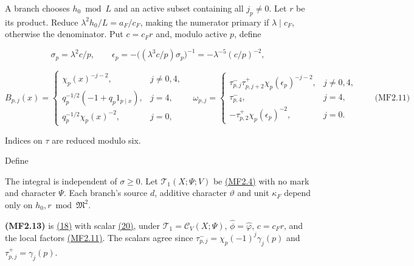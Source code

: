 A branch chooses \(h_0\bmod L\) and an active subset containing all \(j_p\ne0\). Let \(r\) be its product. Reduce \(\lambda^2h_0/L=a_F/c_F\), making the numerator primary if \(\lambda\mid c_F\), otherwise the denominator. Put \(c=c_Fr\) and, modulo active \(p\), define

\[
\sigma_p=\lambda^2c/p,\qquad
\epsilon_p=-\bigl((\lambda^3c/p)\sigma_p\bigr)^{-1}
          =-\lambda^{-5}(c/p)^{-2},
\]

\hypertarget{mf:eq:B2.11}{}

\label{mf:eq:B2.11}

\[
B_{p,j}(x)=
\begin{cases}
\chi_p(x)^{-j-2},&j\ne0,4,\\
q_p^{-1/2}(-1+q_p1_{p\mid x}),&j=4,\\
q_p^{-1/2}\chi_p(x)^{-2},&j=0,
\end{cases}
\quad
\omega_{p,j}=
\begin{cases}
\tau_{p,j}^-\tau_{p,j+2}^+\chi_p(\epsilon_p)^{-j-2},&j\ne0,4,\\
\tau_{p,4}^-,&j=4,\\
-\tau_{p,2}^+\chi_p(\epsilon_p)^{-2},&j=0.
\end{cases}
\qquad\text{(MF2.11)}
\]

Indices on \(\tau\) are reduced modulo six.

Define

\hypertarget{mf:eq:B2.12}{}

\label{mf:eq:B2.12}

\par\noindent\resizebox{\linewidth}{!}{\begin{minipage}{\dimexpr\linewidth+33.76625pt\relax}\[
K_*=\frac{(2\pi)^4}{27},\qquad
\mathcal R(t)=\prod_\pm\frac{\Gamma(1+t\pm1/6)}{\Gamma(1-t\pm1/6)},\qquad
V^\sharp(x)=\frac1{2\pi i}\int_{(\sigma)}
\widehat V(-t)\mathcal R(t)(K_*x)^{-t}\,dt,\quad \sigma\ge0.
\qquad\text{(MF2.12)}
\]\end{minipage}}\par

The integral is independent of \(\sigma\ge0\). Let \(\mathcal T_1(X;\Psi;V)\) be \protect\hyperlink{mf:eq:B2.4}{(MF2.4)} with no mark and character \(\Psi\). Each branch's source \(d\), additive character \(\vartheta\) and unit \(\kappa_F\) depend only on \(h_0,r\bmod\mathfrak M^2\).

\hypertarget{mf:eq:B2.13}{}

\label{mf:eq:B2.13}

\textbf{(MF2.13)} is \protect\hyperlink{cf:eq:B.2}{(18)} with scalar \protect\hyperlink{cf:eq:B.4}{(20)}, under \(\mathcal T_1=\mathcal C_V(X;\Psi)\), \(\widehat\phi=\widehat\varphi\), \(c=c_Fr\), and the local factors \protect\hyperlink{mf:eq:B2.11}{(MF2.11)}. The scalars agree since \(\tau_{p,j}^-=\chi_p(-1)^j\gamma_j(p)\) and \(\tau_{p,j}^+=\gamma_j(p)\).

